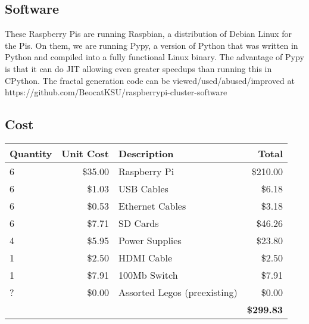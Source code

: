 \documentclass[letterpaper,10pt]{article}
\begin{document}
    \subsection{Software}
      These Raspberry Pis are running Raspbian, a distribution of Debian Linux for the Pis.
      On them, we are running Pypy, a version of Python that was written in Python and compiled into a fully functional Linux binary.
      The advantage of Pypy is that it can do JIT allowing even greater speedups than running this in CPython.
      The fractal generation code can be viewed/used/abused/improved at https://github.com/BeocatKSU/raspberrypi-cluster-software

    \subsection{Cost}
      \begin{center}
        \begin{tabular}{|l|r|l|r|}
          \hline
          \textbf{Quantity}&\textbf{Unit Cost}&\textbf{Description}&\textbf{Total}\\
          \hline
          6&\$35.00&Raspberry Pi&\$210.00\\
          6&\$1.03&USB Cables&\$6.18\\
          6&\$0.53&Ethernet Cables&\$3.18\\
          6&\$7.71&SD Cards&\$46.26\\
          4&\$5.95&Power Supplies&\$23.80\\
          1&\$2.50&HDMI Cable&\$2.50\\
          1&\$7.91&100Mb Switch&\$7.91\\
          ?&\$0.00&Assorted Legos (preexisting)&\$0.00\\
          \hline
	        &&&\textbf{\$299.83}\\
          \hline
        \end{tabular}
      \end{center}
\end{document}
